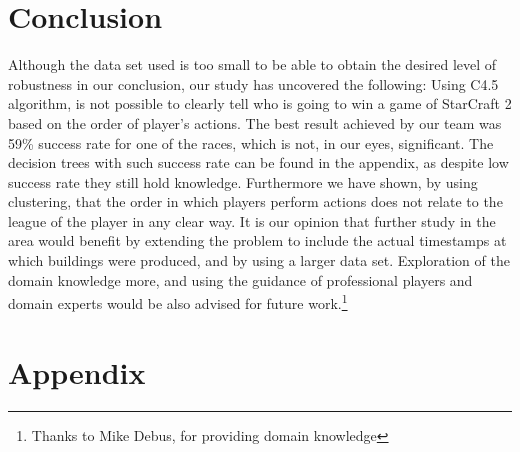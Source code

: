 \documentclass[a4paper,11pt]{article}
\begin{document}
\section{Conclusion}
Although the data set used is too small to be able to obtain the desired level of robustness in our conclusion, our study has uncovered the following:
Using C4.5 algorithm, is not possible to clearly tell who is going to win a game of StarCraft 2 based on the order of player’s actions. The best result achieved by our team was 59\% success rate for one of the races, which is not, in our eyes, significant. The decision trees with such success rate can be found in the appendix, as despite low success rate they still hold knowledge.
Furthermore we have shown, by using clustering, that the order in which players perform actions does not relate to the league of the player in any clear way.
It is our opinion that further study in the area would benefit by extending the problem to include the actual timestamps at which buildings were produced, and by using a larger data set. Exploration of the domain knowledge more, and using the guidance of professional players and domain experts would be also advised for future work.\footnote{Thanks to Mike Debus, for providing domain knowledge}

\newpage

\section*{Appendix}
\appendix

%
\end{document}
